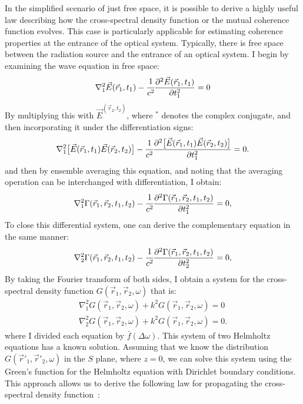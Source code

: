     In the simplified scenario of just free space, it is possible to derive a highly useful law describing how the cross-spectral density function or the mutual coherence function evolves. This case is particularly applicable for estimating coherence properties at the entrance of the optical system. Typically, there is free space between the radiation source and the entrance of an optical system. I begin by examining the wave equation in free space:
    \begin{align}
        \nabla^2_1 \vec{E}(\vec{r}_1, t_1) - \cfrac{1}{c^2} \frac{\partial^2 \vec{E}(\vec{r}_1, t_1)}{\partial t_1^2} = 0
        \label{Eq:wave_eq}
    \end{align}
    By multiplying this with $\vec{E}^(\vec{r}_2, t_2)$, where $^*$ denotes the complex conjugate, and then incorporating it under the differentiation signs:
    \begin{align}
        \nabla^2_1 \big[\vec{E}(\vec{r}_1, t_1) \vec{E}(\vec{r}_2, t_2)\big]- \cfrac{1}{c^2} \frac{\partial^2 \big[\vec{E}(\vec{r}_1, t_1) \vec{E}(\vec{r}_2, t_2)\big]}{\partial t_1^2} = 0.
    \end{align}
    and then by ensemble averaging this equation, and noting that the averaging operation can be interchanged with differentiation, I obtain:
    \begin{align}
        \nabla^2_1 \Gamma(\vec{r}_1, \vec{r}_2, t_1, t_2)  - \cfrac{1}{c^2} \frac{\partial^2 \Gamma(\vec{r}_1, \vec{r}_2, t_1, t_2)}{\partial t_1^2} = 0,
    \end{align}
    To close this differential system, one can derive the complementary equation in the same manner:
    \begin{align}
        \nabla^2_2 \Gamma(\vec{r}_1, \vec{r}_2, t_1, t_2)  - \cfrac{1}{c^2} \frac{\partial^2 \Gamma(\vec{r}_1, \vec{r}_2, t_1, t_2)}{\partial t_2^2} = 0,
    \end{align}
    By taking the Fourier transform of both sides, I obtain a system for the cross-spectral density function $G(\vec{r}_1, \vec{r}_2, \omega)$ that is:
    \begin{align}
        \nabla^2_1 G(\vec{r}_1, \vec{r}_2, \omega) + k^2 G(\vec{r}_1, \vec{r}_2, \omega) = 0\\
        \nabla^2_2 G(\vec{r}_1, \vec{r}_2, \omega) + k^2 G(\vec{r}_1, \vec{r}_2, \omega) =0 .
    \end{align}
    where I divided each equation by $\bar{f}(\Delta \omega)$. This system of two Helmholtz equations has a known solution. Assuming that we know the distribution $G(\vec{r}'_1, \vec{r}'_2, \omega)$ in the $S$ plane, where $z=0$, we can solve this system using the Green's function for the Helmholtz equation with Dirichlet boundary conditions. This approach allows us to derive the following law for propagating the cross-spectral density function~\cite{mandel_optical_1995}:
